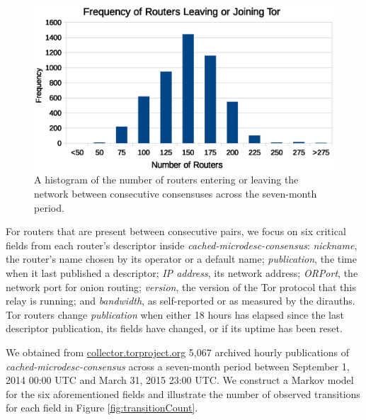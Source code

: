 \begin{figure}[h]
	\centering
	\includegraphics[width=0.7\linewidth]{analysis/LeaveJoinFrequency.eps}
	\caption{A histogram of the number of routers entering or leaving the network between consecutive consensuses across the seven-month period.}
	\label{fig:xorRouters}
\end{figure}

For routers that are present between consecutive pairs, we focus on six critical fields from each router's descriptor inside \emph{cached-microdesc-consensus}: \emph{nickname}, the router's name chosen by its operator or a default name; \emph{publication}, the time when it last published a descriptor; \emph{IP address}, its network address; \emph{ORPort}, the network port for onion routing; \emph{version}, the version of the Tor protocol that this relay is running; and \emph{bandwidth}, as self-reported or as measured by the dirauths. Tor routers change \emph{publication} when either 18 hours has elapsed since the last descriptor publication, its fields have changed, or if its uptime has been reset.

We obtained from \url{collector.torproject.org} 5,067 archived hourly publications of \emph{cached-microdesc-consensus} across a seven-month period between September 1, 2014 00:00 UTC and March 31, 2015 23:00 UTC. We construct a Markov model for the six aforementioned fields and illustrate the number of observed transitions for each field in Figure \ref{fig:transitionCount}.

